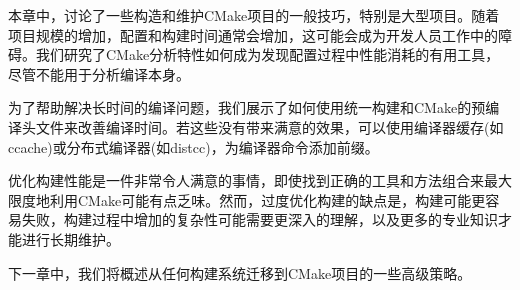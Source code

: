 本章中，讨论了一些构造和维护CMake项目的一般技巧，特别是大型项目。随着项目规模的增加，配置和构建时间通常会增加，这可能会成为开发人员工作中的障碍。我们研究了CMake分析特性如何成为发现配置过程中性能消耗的有用工具，尽管不能用于分析编译本身。

为了帮助解决长时间的编译问题，我们展示了如何使用统一构建和CMake的预编译头文件来改善编译时间。若这些没有带来满意的效果，可以使用编译器缓存(如ccache)或分布式编译器(如distcc)，为编译器命令添加前缀。

优化构建性能是一件非常令人满意的事情，即使找到正确的工具和方法组合来最大限度地利用CMake可能有点乏味。然而，过度优化构建的缺点是，构建可能更容易失败，构建过程中增加的复杂性可能需要更深入的理解，以及更多的专业知识才能进行长期维护。

下一章中，我们将概述从任何构建系统迁移到CMake项目的一些高级策略。